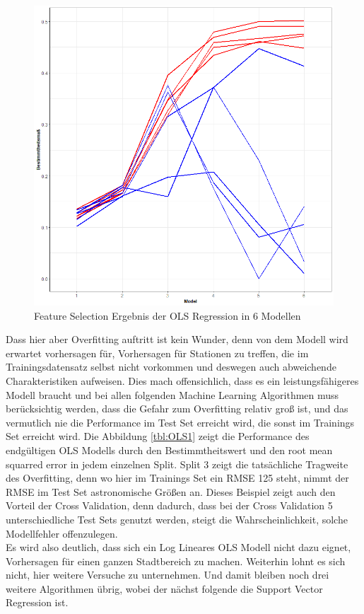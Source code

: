 \documentclass[a4paper,12pt]{thesis}
\begin{document}
\begin{figure}[!ht]
	\centering
	\includegraphics[width=\textwidth]{Plots/plot30.png}
	\caption{Feature Selection  Ergebnis der OLS Regression in 6 Modellen}
	\label{OLS_ModelSelection}
\end{figure}

Dass hier aber Overfitting auftritt ist kein Wunder, denn von dem Modell wird erwartet vorhersagen für, Vorhersagen für Stationen zu treffen, die im Trainingsdatensatz selbst nicht vorkommen und deswegen auch abweichende Charakteristiken aufweisen. Dies mach offensichlich, dass es ein leistungsfähigeres Modell braucht und bei allen folgenden Machine Learning Algorithmen muss berücksichtig werden, dass die Gefahr zum Overfitting relativ groß ist, und das vermutlich nie die Performance im Test Set erreicht wird, die sonst im Trainings Set erreicht wird. Die Abbildung \ref{tbl:OLS1} zeigt die Performance des endgültigen OLS Modells durch den Bestimmtheitswert und den root mean squarred error in jedem einzelnen Split. Split 3 zeigt die tatsächliche Tragweite des Overfitting, denn wo hier im Trainings Set ein RMSE 125 steht, nimmt der RMSE im Test Set astronomische Größen an. Dieses Beispiel zeigt auch den Vorteil der Cross Validation, denn dadurch, dass bei der Cross Validation 5 unterschiedliche Test Sets genutzt werden, steigt die Wahrscheinlichkeit, solche Modellfehler offenzulegen.\\
Es wird also deutlich, dass sich ein Log Lineares OLS Modell nicht dazu eignet, Vorhersagen für einen ganzen Stadtbereich zu machen. Weiterhin lohnt es sich nicht, hier weitere Versuche zu unternehmen. Und damit bleiben noch drei weitere Algorithmen übrig, wobei der nächst folgende die Support Vector Regression ist.
\end{document}
